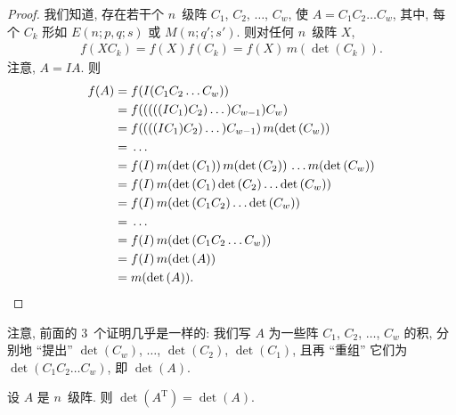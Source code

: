 \documentclass[../libro.tex]{subfiles}
\begin{document}
\begin{proof}
    我们知道,
    存在若干个 \(n\)~级阵
    \(C_1\), \(C_2\), \(\dots\), \(C_w\),
    使 \(A = C_1 C_2 \dots C_w\),
    其中, 每个 \(C_k\) 形如
    \(E(n; p, q; s)\) 或 \(M(n; q'; s')\).
    则对任何 \(n\)~级阵 \(X\),
    \begin{align*}
        f(X C_k)
        = f(X) f(C_k)
        = f(X)\, m(\det {(C_k)}).
    \end{align*}
    注意, \(A = I A\).
    则
    \begin{align*}
        f(A)
        = {} &
        f (I (C_1 C_2 \dots C_w))
        \\
        = {} &
        f (((((I C_1) C_2) \dots) C_{w-1}) C_w)
        \\
        = {} &
        f ((((I C_1) C_2) \dots) C_{w-1})\,
        m(\det {(C_w)})
        \\
        = {} &
        \dots
        \\
        = {} &
        f(I)\,
        m(\det {(C_1)})\,
        m(\det {(C_2)})\,
        \dots
        m(\det {(C_w)})
        \\
        = {} &
        f(I)\,
        m(\det {(C_1)} \det {(C_2)} \dots \det {(C_w)})
        \\
        = {} &
        f(I)\,
        m(\det {(C_1 C_2)} \dots \det {(C_w)})
        \\
        = {} &
        \dots
        \\
        = {} &
        f(I)\,
        m(\det {(C_1 C_2 \dots C_w)})
        \\
        = {} &
        f(I)\, m(\det {(A)})
        \\
        = {} &
        m(\det {(A)}).
        \qedhere
    \end{align*}
\end{proof}

注意, 前面的 \(3\)~个证明几乎是一样的:
我们写 \(A\) 为一些阵
\(C_1\), \(C_2\), \(\dots\), \(C_w\) 的积,
分别地 ``提出''
\(\det {(C_w)}\), \(\dots\), \(\det {(C_2)}\), \(\det {(C_1)}\),
且再 ``重组'' 它们为
\(\det {(C_1 C_2 \dots C_w)}\),
即 \(\det {(A)}\).

\begin{theorem}
    设 \(A\) 是 \(n\)~级阵.
    则 \(\det {(A^{\mathrm{T}})} = \det {(A)}\).
\end{theorem}
\end{document}
